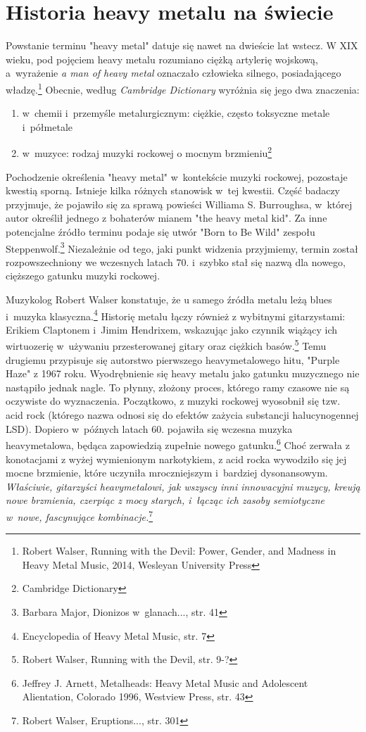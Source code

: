 \documentclass[12pt, a4paper, titlepage]{report}
\begin{document}
\section{Historia heavy metalu na świecie}
Powstanie terminu "heavy metal" datuje się nawet na dwieście lat wstecz. W XIX wieku, pod pojęciem heavy metalu rozumiano ciężką artylerię wojskową, a~wyrażenie \textit{a man of heavy metal} oznaczało człowieka silnego, posiadającego władzę.\footnote{Robert Walser, Running with the Devil: Power, Gender, and Madness in Heavy Metal Music, 2014, Wesleyan University Press}  Obecnie, według \textit{Cambridge Dictionary} wyróżnia się jego dwa znaczenia: 
\begin{enumerate}
\item w~chemii i~przemyśle metalurgicznym: ciężkie, często toksyczne metale  i~półmetale
\item w~muzyce: rodzaj muzyki rockowej o mocnym brzmieniu\footnote{Cambridge Dictionary}
\end{enumerate}
Pochodzenie określenia "heavy metal" w~kontekście muzyki rockowej, pozostaje kwestią sporną. Istnieje kilka różnych stanowisk w~tej kwestii. Część badaczy przyjmuje, że pojawiło się za sprawą powieści Williama S. Burroughsa, w~której autor określił jednego z bohaterów mianem "the heavy metal kid". Za inne potencjalne źródło terminu podaje się utwór "Born to Be Wild" zespołu Steppenwolf.\footnote{Barbara Major, Dionizos w~glanach..., str. 41} Niezależnie od tego, jaki punkt widzenia przyjmiemy, termin został rozpowszechniony we wczesnych latach 70. i~szybko stał się nazwą dla nowego, cięższego gatunku muzyki rockowej. 

 
Muzykolog Robert Walser konstatuje, że u samego źródła metalu leżą blues i~muzyka klasyczna.\footnote{Encyclopedia of Heavy Metal Music, str. 7} %
Historię metalu łączy również z wybitnymi gitarzystami: Erikiem Claptonem i~Jimim Hendrixem, wskazując jako czynnik wiążący ich wirtuozerię w~używaniu przesterowanej gitary oraz ciężkich basów.\footnote{Robert Walser, Running with the Devil, str. 9-?} Temu drugiemu przypisuje się autorstwo pierwszego heavymetalowego hitu, "Purple Haze" z 1967 roku. Wyodrębnienie się heavy metalu jako gatunku muzycznego nie nastąpiło jednak nagle. To płynny, złożony proces, którego ramy czasowe nie są oczywiste do wyznaczenia. Początkowo, z muzyki rockowej wyosobnił się tzw. acid rock (którego nazwa odnosi się do efektów zażycia substancji halucynogennej LSD). Dopiero w~późnych latach 60. pojawiła się wczesna muzyka heavymetalowa, będąca zapowiedzią zupełnie nowego gatunku.\footnote{Jeffrey J. Arnett, Metalheads: Heavy Metal Music and Adolescent Alientation, Colorado 1996, Westview Press, str. 43} Choć zerwała z konotacjami z wyżej wymienionym narkotykiem, z acid rocka wywodziło się jej mocne brzmienie, które uczyniła mroczniejszym i~bardziej dysonansowym. \textit{Właściwie, gitarzyści heavymetalowi, jak wszyscy inni innowacyjni muzycy, kreują nowe brzmienia, czerpiąc z mocy starych, i~łącząc ich zasoby semiotyczne w~nowe, fascynujące kombinacje.}\footnote{Robert Walser, Eruptions..., str. 301} 
\end{document}
